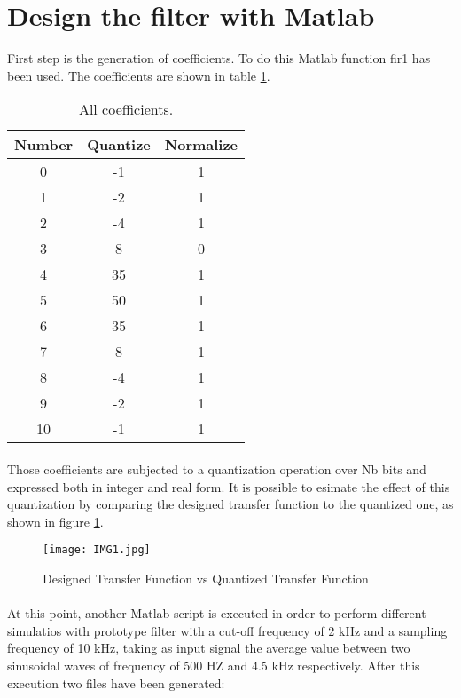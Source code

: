 \section{Design the filter with Matlab}

First step is the generation of coefficients. To do this Matlab function fir1 has been used.
The coefficients are shown in table \ref{tab:1}. %

\begin{table}[ht]
\centering
\begin{tabular}{c|c|c}
\toprule
Number & Quantize & Normalize \\
\midrule
0 & -1 & 1 \\
1 & -2 & 1 \\
2 & -4 & 1 \\
3 & 8 & 0 \\
4 & 35 & 1 \\
5 & 50 & 1 \\
6 & 35 & 1 \\
7 & 8 & 1 \\
8 & -4 & 1 \\
9 & -2 & 1 \\
10 & -1 & 1 \\
\bottomrule
\end{tabular}
\caption{All coefficients.}
\label{tab:1}
\end{table}
\paragraph{}
Those coefficients are subjected to a quantization operation over Nb bits and expressed both in integer and real form.
It is possible to esimate the effect of this quantization by comparing the designed transfer function to the quantized one, as shown in figure \ref{fig:1}.
\begin{figure}[!ht]
	\caption{Designed Transfer Function vs Quantized Transfer Function}
	\label{fig:1}
	\texttt{[image: IMG1.jpg]}
	\centering
\end{figure}

\paragraph{}
At this point, another Matlab script is executed in order to perform
different simulatios with prototype filter with a cut-off frequency of 2 kHz and a sampling frequency of 10 kHz, taking as 
input signal the average value between two sinusoidal waves of frequency of 500 HZ and 4.5 kHz respectively.
After this execution two files have been generated:

